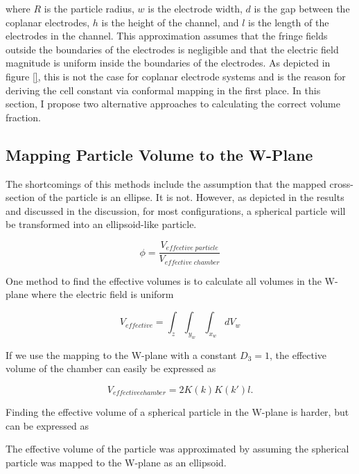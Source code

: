\noindent where $R$ is the particle radius, $w$ is the electrode width, $d$ is the gap between the coplanar electrodes, $h$ is the height of the channel, and $l$ is the length of the electrodes in the channel. This approximation assumes that the fringe fields outside the boundaries of the electrodes is negligible and that the electric field magnitude is uniform inside the boundaries of the electrodes. As depicted in figure \ref{}, this is not the case for coplanar electrode systems and is the reason for deriving the cell constant via conformal mapping in the first place. In this section, I propose two alternative approaches to calculating the correct volume fraction. 

\subsection*{Mapping Particle Volume to the W-Plane}
\par The shortcomings of this methods include the assumption that the mapped cross-section of the particle is an ellipse. It is not. However, as depicted in the results and discussed in the discussion, for most configurations, a spherical particle will be transformed into an ellipsoid-like particle. 

\begin{equation}
    \phi = \frac{V_{effective\;particle}}{V_{effective\;chamber}}
\end{equation}

\par One method to find the effective volumes is to calculate all volumes in the W-plane where the electric field is uniform

\begin{equation}
    V_{effective} = \int_{z}\int_{y_w}\int_{x_w} dV_w
\end{equation}

\noindent If we use the mapping to the W-plane with a constant $D_3 = 1$, the effective volume of the chamber can easily be expressed as

\begin{equation}
    V_{effective chamber} = 2K(k)K(k')l.
\end{equation}

\noindent Finding the effective volume of a spherical particle in the W-plane is harder, but can be expressed as



\par The effective volume of the particle was approximated by assuming the spherical particle was mapped to the W-plane as an ellipsoid. 

